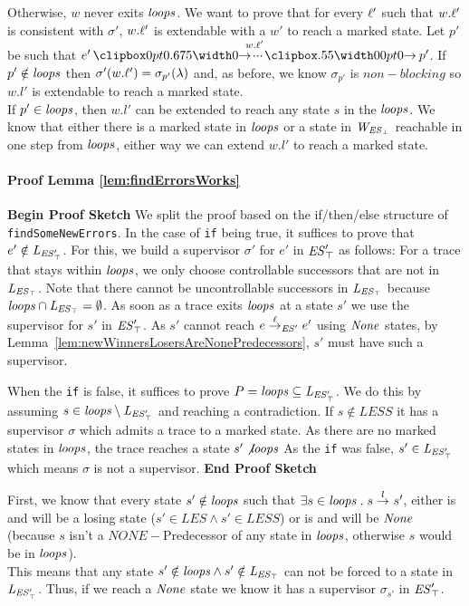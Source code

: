 Otherwise, $w$ never exits $\mathit{loops}$. We want to prove that for every $\ell'$ such that $w.\ell'$ is consistent with $\sigma'$, $w.\ell'$ is extendable with a $w'$ to reach a marked state. Let $p'$ be such that $e' \runw{w.\l'}{} p'$. If $p' \notin \mathit{loops}$ then $\sigma'(w.\ell') = \sigma_{p'}(\lambda)$ and, as before, we know $\sigma_{p'}$ is $non-blocking$ so $w.l'$ is extendable to reach a marked state.\\
If $p' \in \mathit{loops}$, then  $w.l'$ can be extended to reach any state $s$ in the $\mathit{loops}$. We know that either there is a marked state in $\mathit{loops}$ or a state in $\mathit{W_{\mathit{\mathit{ES}_{\bot}}}}$ reachable in one step from $\mathit{loops}$, either way we can extend $w.l'$ to reach a marked state.



 

\paragraph*{Proof Lemma \ref{lem:findErrorsWorks}}
\textbf{{Begin Proof Sketch}}
We split the proof based on the if/then/else structure of \texttt{findSomeNewErrors}. 
In the case of \texttt{if} being true, it suffices to prove that $e' \notin \mathit{L_{\mathit{\mathit{ES}'_{\top}}}}$. For this, 
we build a supervisor $\sigma'$ for $e'$ in $\mathit{\mathit{ES}'_{\top}}$ as 
follows: For a trace that stays within $\mathit{loops}$, we only choose controllable successors 
that are not 
in $\mathit{L_{\mathit{\mathit{ES}_{\top}}}}$. Note that there cannot be uncontrollable successors in $\mathit{L_{\mathit{\mathit{ES}_{\top}}}}$ because 
$\mathit{loops} \cap \mathit{L_{\mathit{\mathit{ES}_{\top}}}}= \emptyset$.   As soon as a trace exits $\mathit{loops}$ at a state $s'$ we 
use the supervisor for $s'$ in $\mathit{\mathit{ES}'_{\top}}$. 
As $s'$ cannot reach $e \overset{\ell}{\rightarrow}_{\mathit{ES}'} 
e'$ using $\mathit{None}$ states, by 
Lemma~\ref{lem:newWinnersLosersAreNonePredecessors}, $s'$ must have such a 
supervisor. 
 
When the \texttt{if} is false, it suffices to prove $P = \mathit{loops} \subseteq \mathit{L_{\mathit{\mathit{ES}'_{\top}}}}$. We do 
this by assuming $s \in \mathit{loops} \setminus \mathit{L_{\mathit{\mathit{ES}'_{\top}}}}$ and reaching a contradiction. If $s 
\notin LESS$ it has a supervisor $\sigma$ which admits a trace to a marked state. As 
there are no marked states in $\mathit{loops}$, the trace reaches a state $s' \not \mathit{loops}$ As the 
\texttt{if} was false, $s' \in \mathit{L_{\mathit{\mathit{ES}'_{\top}}}}$ which means $\sigma$ is not a supervisor.
\textbf{{End Proof Sketch}}


First, we know that every state $s' \notin \mathit{loops}$ such that $\exists s \in \mathit{loops} \;.\; s 
\overset{l}{\rightarrow}_{} s'$, either is and will be a losing state ($s' \in LES \wedge s' \in LESS$) or is 
and will be $\mathit{None}$ (because $s$ isn't a $NONE-$Predecessor of any state in 
$\mathit{loops}$, otherwise $s$ would be in $\mathit{loops}$). \\
This means that any state $s' \notin \mathit{loops} \wedge s' \notin \mathit{L_{\mathit{\mathit{ES}_{\top}}}}$ can not be forced to a state in $\mathit{L_{\mathit{\mathit{ES}'_{\top}}}}$. Thus, if we reach a $\mathit{None}$ state we know it has a supervisor $\sigma_{s'}$ in $\mathit{\mathit{ES}'_{\top}}$.

